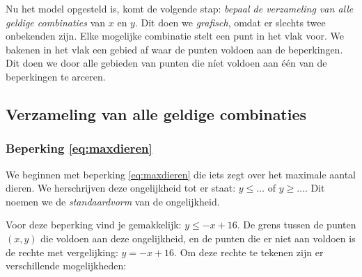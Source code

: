 Nu het model opgesteld is, komt 
de volgende stap: \emph{bepaal de verzameling van alle geldige
combinaties} van $x$ en $y$. Dit doen we \emph{grafisch}, omdat er
slechts twee onbekenden zijn. Elke mogelijke combinatie stelt een punt
in het vlak voor. We bakenen in het vlak een gebied af waar de punten voldoen aan de beperkingen. Dit doen we door alle gebieden van punten die n\'iet voldoen aan \'e\'en van de beperkingen te arceren. 

\subsection{Verzameling van alle geldige combinaties}

\subsubsection{Beperking \eqref{eq:maxdieren}}


We beginnen met beperking \eqref{eq:maxdieren} die iets zegt over het maximale
aantal dieren. We herschrijven deze ongelijkheid tot er staat: $y \leqslant
\ldots$ of $y \geqslant \ldots$. Dit noemen we de \emph{standaardvorm}
van de ongelijkheid.

Voor deze beperking vind je gemakkelijk: $y \leqslant -x + 16$. De grens tussen de punten $(x,y)$ die voldoen aan
deze ongelijkheid, en de punten die er niet aan voldoen is de
rechte met vergelijking: $y=-x + 16$.
Om deze rechte te tekenen zijn er verschillende mogelijkheden:


